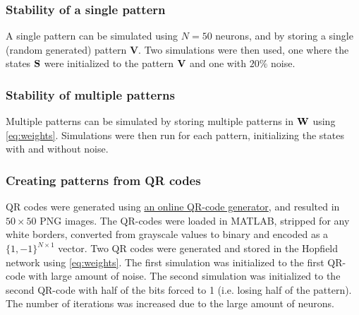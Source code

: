 \subsubsection*{Stability of a single pattern}
A single pattern can be simulated using $N=50$ neurons, and by storing a single (random generated) pattern $\mathbf{V}$. Two simulations were then used, one where the states $\bf S$ were initialized to the pattern $\bf V$ and one with $20\%$ noise.
\subsubsection*{Stability of multiple patterns}
Multiple patterns can be simulated by storing multiple patterns in $\bf W$ using \cref{eq:weights}. Simulations were then run for each pattern, initializing the states with and without noise.

\subsubsection{Creating patterns from QR codes}
QR codes were generated using \href{https://miniwebtool.com/qr-code-generator/}{an online QR-code generator}, and resulted in $50 \times 50$ PNG images. The QR-codes were loaded in MATLAB, stripped for any white borders, converted from grayscale values to binary and encoded as a $\{1, -1\}^{N \times 1}$ vector. Two QR codes were generated and stored in the Hopfield network using \cref{eq:weights}. The first simulation was initialized to the first QR-code with large amount of noise. The second simulation was initialized to the second QR-code with half of the bits forced to 1 (i.e. losing half of the pattern). The number of iterations was increased due to the large amount of neurons.





